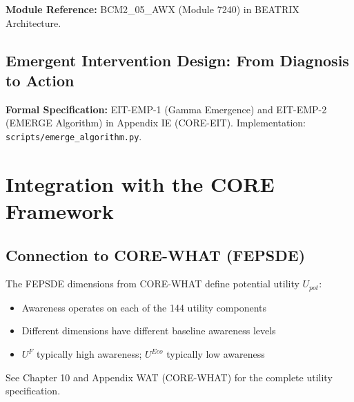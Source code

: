 

\begin{cross-reference}
\textbf{Module Reference:} BCM2\_05\_AWX (Module 7240) in BEATRIX Architecture.
\end{cross-reference}

\subsection{Emergent Intervention Design: From Diagnosis to Action}
\label{subsec:11-20-emergent-design}



\begin{cross-reference}
\textbf{Formal Specification:} EIT-EMP-1 (Gamma Emergence) and EIT-EMP-2 (EMERGE Algorithm)
in Appendix IE (CORE-EIT). Implementation: \texttt{scripts/emerge\_algorithm.py}.
\end{cross-reference}



\section{Integration with the CORE Framework}
\label{sec:awareness-9c-integration}


\subsection{Connection to CORE-WHAT (FEPSDE)}

\begin{cross-reference}
The FEPSDE dimensions from CORE-WHAT define potential utility $U_{pot}$:
\begin{itemize}[nosep]
  \item Awareness operates on each of the 144 utility components
  \item Different dimensions have different baseline awareness levels
  \item $U^F$ typically high awareness; $U^{Eco}$ typically low awareness
\end{itemize}
See Chapter 10 and Appendix WAT (CORE-WHAT) for the complete utility specification.
\end{cross-reference}

